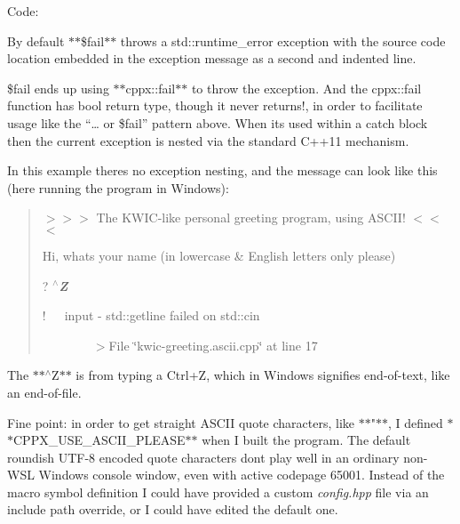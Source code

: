 Code\+:


\begin{DoxyCode}{0}
\DoxyCodeLine{\{}
\DoxyCodeLine{\}}
\end{DoxyCode}


By default $\ast$$\ast${\ttfamily \$fail}$\ast$$\ast$ throws a {\ttfamily std\+::runtime\+\_\+error} exception with the source code location embedded in the exception message as a second and indented line.

{\ttfamily \$fail} ends up using $\ast$$\ast${\ttfamily cppx\+::fail}$\ast$$\ast$ to throw the exception. And the {\ttfamily cppx\+::fail} function has {\ttfamily bool} return type, though it never returns!, in order to facilitate usage like the “{\ttfamily … or \$fail}” pattern above. When it\textquotesingle{}s used within a {\ttfamily catch} block then the current exception is nested via the standard C++11 mechanism.

In this example there\textquotesingle{}s no exception nesting, and the message can look like this (here running the program in Windows)\+:

\begin{quote}
{\ttfamily $>$$>$$>$ The K\+W\+I\+C-\/like personal greeting program, using A\+S\+C\+I\+I! $<$$<$$<$}

{\ttfamily Hi, what\textquotesingle{}s your name (in lowercase \& English letters only please)}

{\ttfamily ?} {\itshape {\bfseries{$^\wedge$Z}}}

{\ttfamily !~~~input -\/ std\+::getline failed on std\+::cin}

{\ttfamily ~~~~~~~~$>$File \char`\"{}kwic-\/greeting.\+ascii.\+cpp\char`\"{} at line 17}

\end{quote}


The $\ast$$\ast${\ttfamily $^\wedge$Z}$\ast$$\ast$ is from typing a {\ttfamily Ctrl}+{\ttfamily Z}, which in Windows signifies end-\/of-\/text, like an end-\/of-\/file.

Fine point\+: in order to get straight A\+S\+C\+II quote characters, like $\ast$$\ast${\ttfamily "}$\ast$$\ast$, I defined $\ast$$\ast${\ttfamily C\+P\+P\+X\+\_\+\+U\+S\+E\+\_\+\+A\+S\+C\+I\+I\+\_\+\+P\+L\+E\+A\+SE}$\ast$$\ast$ when I built the program. The default roundish U\+T\+F-\/8 encoded quote characters don\textquotesingle{}t play well in an ordinary non-\/\+W\+SL Windows console window, even with active codepage 65001. Instead of the macro symbol definition I could have provided a custom {\itshape config.\+hpp} file via an include path override, or I could have edited the default one.

